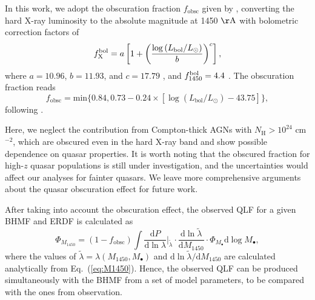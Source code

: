 \documentclass[twocolumn, twocolappendix]{aastex63}
\newcommand{\Mbh}{M_\bullet}
\newcommand{\fobsc}{f_\mathrm{obsc}}
\newcommand{\Muv}{M_{1450}}
\newcommand{\Lbol}{L_\mathrm{bol}}
\newcommand{\D}{\mathrm{d}}
\newcommand{\red}[1]{\textcolor{red}{ #1}}
\begin{document}
\begin{CJK*}{UTF8}{gbsn}
In this work, we adopt the obscuration fraction $\fobsc$ given by \citet{2014ApJ...786..104U}, 
converting the hard X-ray luminosity to the absolute magnitude at 1450 $\mathrm{\AA}$ with bolometric correction factors of
\begin{equation*}
  f^{\rm bol}_{\rm X} =
  a\left[1+\left(\frac{\log \left(\Lbol / L_\odot\right)}{b}\right)^{c}\right],
\end{equation*}
where $a=10.96$, $b = 11.93$, and $c = 17.79$ \citep[Eq.~2 in ][]{2020A&A...636A..73D}, 
and $f^{\rm bol}_{1450}=4.4$ \citep{2006ApJS..166..470R}.
The obscuration fraction reads 
\begin{equation*}
  \fobsc = \text{min}\lbrace  0.84 , 0.73-0.24\times[ \log (\Lbol/L_\odot) -43.75] \rbrace,
\end{equation*}
following \citet{2014ApJ...786..104U}.


Here, we neglect the contribution from Compton-thick AGNs with $N_\mathrm{H}>10^{24}$ cm$^{-2}$, 
which are obscured even in the hard X-ray band and show possible dependence on quasar properties.
It is worth noting that the obscured fraction for high-$z$ quasar populations is still under investigation,
and the uncertainties would affect our analyses for fainter quasars.
We leave more comprehensive arguments about the quasar obscuration effect for future work.

After taking into account the obscuration effect, 
the observed QLF for a given BHMF and ERDF is calculated as
\begin{equation}
\label{eq:dn_dM1450}
\Phi_{\Muv} 
 = (1 -\fobsc)  %
\int \frac{\D P}{\D \ln \lambda}\Big|_{\tilde{\lambda}}  \cdot
\frac{\D \ln \tilde{\lambda}}{\D \Muv} \cdot
 \Phi_{\Mbh} \D \log \Mbh,
\end{equation}
%
where the values of $\tilde{\lambda}=\lambda(\Muv, \Mbh)$ and $\D \ln \tilde{\lambda}/\D \Muv$ are calculated analytically from Eq.~(\ref{eq:M1450}).
%
Hence, the observed QLF can be produced simultaneously with the BHMF from a set of model parameters, 
to be compared with the ones from observation.





\end{CJK*}
\end{document}

